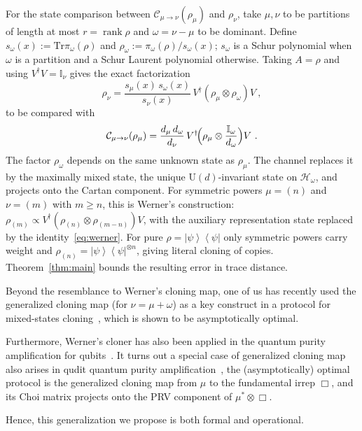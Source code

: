\documentclass[a4paper,onecolumn,11pt]{quantumarticle}
\newcommand{\ketbra}[2]{\left|#1\right\rangle\!\!\left\langle #2\right|}
\def\h{\mathcal{H}}
\def\id{\mathbb{I}}
\newcommand*{\Tr}{\mathrm{Tr}}
\def\map{\mathcal}
\begin{document}
For the state comparison between $\map C_{\mu\to\nu}(\rho_\mu)$ and $\rho_\nu$, take $\mu,\nu$ to be partitions of length at
most $r=\operatorname{rank}\rho$ and $\omega=\nu-\mu$ to be dominant.
Define
$s_\omega(x):=\Tr\pi_\omega(\rho)$ and
$\rho_\omega:=\pi_\omega(\rho)/s_\omega(x)$; $s_\omega$ is a Schur
polynomial when $\omega$ is a partition and a Schur Laurent polynomial
otherwise.
Taking $A=\rho$ and using $V^\dagger V=\id_\nu$ gives the exact factorization
\begin{equation}\label{eq:cartan_factorization}
\rho_\nu=\frac{s_\mu(x)\,s_\omega(x)}{s_\nu(x)}\,V^\dagger(\rho_\mu\otimes\rho_\omega)V\ ,
\end{equation}
to be compared with
\begin{equation}\label{eq:cloner_substitution}
\mathcal C_{\mu\to\nu}(\rho_\mu)=\frac{d_\mu\,d_\omega}{d_\nu}\,V^\dagger\!\Bigl(\rho_\mu\otimes\frac{\id_\omega}{d_\omega}\Bigr)V\ .
\end{equation}
The factor $\rho_\omega$ depends on the same unknown state as
$\rho_\mu$. The channel replaces it by the maximally mixed state,
the unique $\mathrm U(d)$-invariant state on $\h_\omega$, and projects
onto the Cartan component. For symmetric powers $\mu=(n)$ and
$\nu=(m)$ with $m\ge n$, this is Werner's construction:
$\rho_{(m)}\propto V^\dagger(\rho_{(n)}\otimes\rho_{(m-n)})V$,
with the auxiliary representation state replaced by the identity~\eqref{eq:werner}. For pure $\rho=\ketbra{\psi}{\psi}$ only symmetric powers carry weight
and $\rho_{(n)}=\ketbra{\psi}{\psi}^{\otimes n}$, giving literal cloning
of copies. 
Theorem~\ref{thm:main} bounds the resulting error in trace distance.

Beyond the resemblance to Werner's cloning map, one of us has recently used the generalized cloning map (for $\nu=\mu+\omega$) as a key construct in a protocol for mixed-states cloning~\cite{fei2026}, which is shown to be asymptotically optimal.  

Furthermore, Werner's cloner has also been applied in the quantum purity amplification for qubits~\cite{keyl2001rate}. It turns out a special case of generalized cloning map also arises in qudit quantum purity amplification~\cite{li2025purity,li2026_1,li2026_2}, the (asymptotically) optimal protocol is the generalized cloning map from $\mu$ to the fundamental irrep $\Box$, and its Choi matrix projects onto the PRV component of $\mu^*\otimes\Box$.

Hence, this generalization we propose is both formal and operational. 
\end{document}
